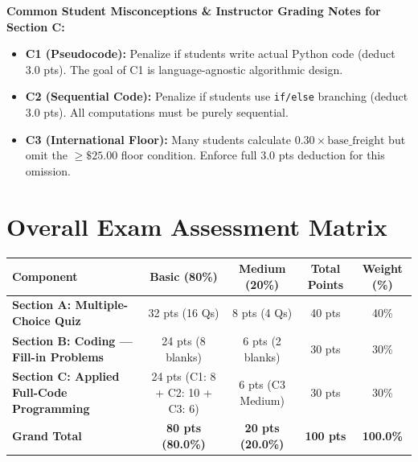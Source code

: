 \documentclass[11pt,a4paper]{article}
\begin{document}
\vspace{1.0mm}
\begin{tcolorbox}[colback=yellow!8, colframe=orange!80!black, arc=1.0mm, boxrule=0.5pt, left=2.0mm, right=2.0mm, top=1.0mm, bottom=1.0mm]
\small
\textbf{Common Student Misconceptions \& Instructor Grading Notes for Section C:}
\begin{itemize}[itemsep=0.2pt,topsep=0.2pt]
  \item \textbf{C1 (Pseudocode):} Penalize if students write actual Python code (deduct 3.0 pts). The goal of C1 is language-agnostic algorithmic design.
  \item \textbf{C2 (Sequential Code):} Penalize if students use \texttt{if/else} branching (deduct 3.0 pts). All computations must be purely sequential.
  \item \textbf{C3 (International Floor):} Many students calculate $0.30 \times \text{base\_freight}$ but omit the $\ge \$25.00$ floor condition. Enforce full 3.0 pts deduction for this omission.
\end{itemize}
\end{tcolorbox}

\vspace{1.0mm}
\section*{Overall Exam Assessment Matrix}
\begin{center}
\renewcommand{\arraystretch}{1.15}
\setlength{\tabcolsep}{4.0pt}
\begin{tabularx}{\textwidth}{|X|c|c||c|c|}
\hline
\textbf{Component} & \textbf{Basic (80\%)} & \textbf{Medium (20\%)} & \textbf{Total Points} & \textbf{Weight (\%)} \\
\hline
\textbf{Section A: Multiple-Choice Quiz} & 32 pts (16 Qs) & 8 pts (4 Qs) & 40 pts & 40\% \\
\hline
\textbf{Section B: Coding --- Fill-in Problems} & 24 pts (8 blanks) & 6 pts (2 blanks) & 30 pts & 30\% \\
\hline
\textbf{Section C: Applied Full-Code Programming} & 24 pts (C1: 8 + C2: 10 + C3: 6) & 6 pts (C3 Medium) & 30 pts & 30\% \\
\hline
\hline
\textbf{Grand Total} & \textbf{80 pts (80.0\%)} & \textbf{20 pts (20.0\%)} & \textbf{100 pts} & \textbf{100.0\%} \\
\hline
\end{tabularx}
\end{center}
\end{document}
